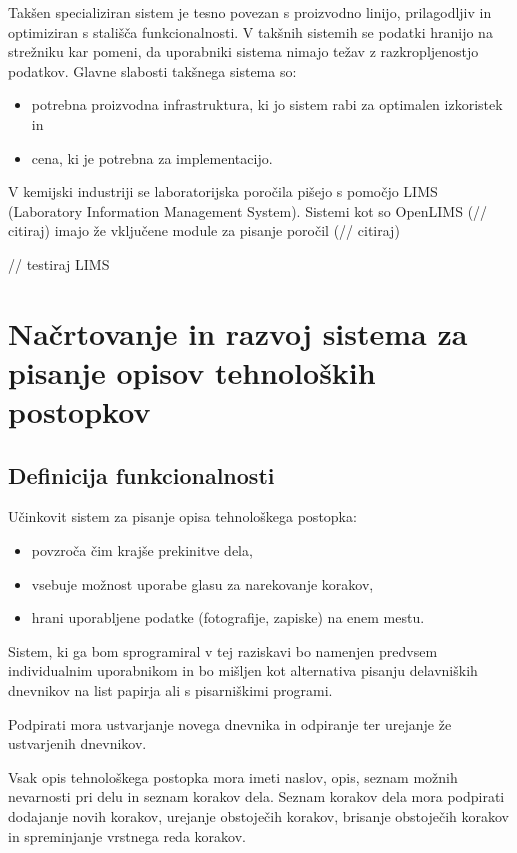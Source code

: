 \documentclass[a4paper, 12pt]{book}
\begin{document}
Takšen specializiran sistem je tesno povezan s proizvodno linijo, prilagodljiv in optimiziran s stališča funkcionalnosti.
V takšnih sistemih se podatki hranijo na strežniku kar pomeni, da uporabniki sistema nimajo težav z razkropljenostjo podatkov.
Glavne slabosti takšnega sistema so:
\begin{itemize}
	\item potrebna proizvodna infrastruktura, ki jo sistem rabi za optimalen izkoristek in
	\item cena, ki je potrebna za implementacijo.
\end{itemize}

V kemijski industriji se laboratorijska poročila pišejo s pomočjo LIMS (Laboratory Information Management System).
Sistemi kot so OpenLIMS (// citiraj) imajo že vključene module za pisanje poročil (// citiraj)

// testiraj LIMS 




\chapter{Načrtovanje in razvoj sistema za pisanje opisov tehnoloških postopkov}

\section{Definicija funkcionalnosti}

Učinkovit sistem za pisanje opisa tehnološkega postopka:
\begin{itemize}
	\item povzroča čim krajše prekinitve dela,
	\item vsebuje možnost uporabe glasu za narekovanje korakov,
	\item hrani uporabljene podatke (fotografije, zapiske) na enem mestu.
\end{itemize}

Sistem, ki ga bom sprogramiral v tej raziskavi bo namenjen predvsem individualnim uporabnikom in bo mišljen kot alternativa pisanju delavniških dnevnikov na list papirja ali s pisarniškimi programi.

Podpirati mora ustvarjanje novega dnevnika in odpiranje ter urejanje že ustvarjenih dnevnikov.

Vsak opis tehnološkega postopka mora imeti naslov, opis, seznam možnih nevarnosti pri delu in seznam korakov dela.
Seznam korakov dela mora podpirati dodajanje novih korakov, urejanje obstoječih korakov, brisanje obstoječih korakov in spreminjanje vrstnega reda korakov.
\end{document}
